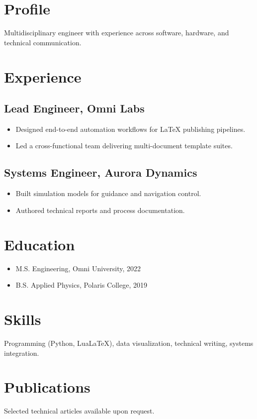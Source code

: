 \documentclass[
    language=english,
    doctype=cv,
    institution=none,
    titlestyle=cv
]{../../omnilatex}
\begin{document}
\maketitle

\section{Profile}
Multidisciplinary engineer with experience across software, hardware, and technical communication.

\section{Experience}
\subsection{Lead Engineer, Omni Labs}
\begin{itemize}
    \item Designed end-to-end automation workflows for LaTeX publishing pipelines.
    \item Led a cross-functional team delivering multi-document template suites.
\end{itemize}

\subsection{Systems Engineer, Aurora Dynamics}
\begin{itemize}
    \item Built simulation models for guidance and navigation control.
    \item Authored technical reports and process documentation.
\end{itemize}

\section{Education}
\begin{itemize}
    \item M.S. Engineering, Omni University, 2022
    \item B.S. Applied Physics, Polaris College, 2019
\end{itemize}

\section{Skills}
Programming (Python, LuaLaTeX), data visualization, technical writing, systems integration.

\section{Publications}
Selected technical articles available upon request.
\end{document}
